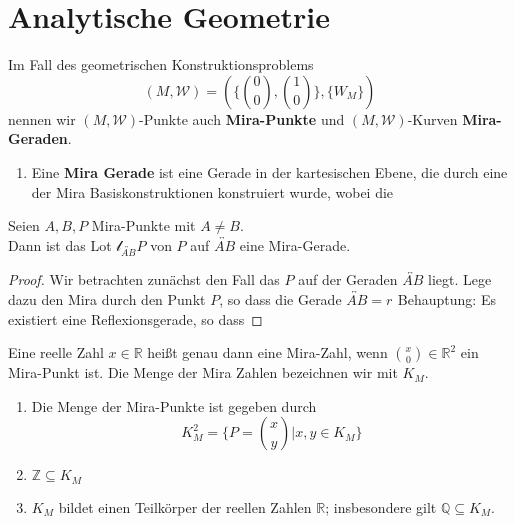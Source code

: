 \chapter{Analytische Geometrie}

\begin{definition}
    Im Fall des geometrischen Konstruktionsproblems
    \[ (M,\mathcal{W}) = (\{\binom{0}{0},\binom{1}{0} \}, \{ W_M\}) \]
    nennen wir $(M,\mathcal{W})$-Punkte auch \textbf{Mira-Punkte} und $(M,\mathcal{W})$-Kurven \textbf{Mira-Geraden}.
\end{definition}

\begin{definition}
    \begin{enumerate}
        \item Eine \textbf{Mira Gerade} ist eine Gerade in der kartesischen Ebene, die durch eine der Mira Basiskonstruktionen konstruiert wurde, wobei die 
    \end{enumerate}
\end{definition}

\begin{lemma}
    \label{Lot}
    Seien $A,B,P$ Mira-Punkte mit $A \neq B$. \\
    Dann ist das Lot $\mathcal{l}_{\overleftrightarrow{AB}}P$ von $P$ auf $\overleftrightarrow{AB}$ eine Mira-Gerade.
\end{lemma}

\begin{proof}
    Wir betrachten zunächst den Fall das $P$ auf der Geraden $\overleftrightarrow{AB}$ liegt.
    Lege dazu den Mira durch den Punkt $P$, so dass die Gerade $\overleftrightarrow{AB} = r_{}$
    Behauptung: Es existiert eine Reflexionsgerade, so dass 
\end{proof}

\begin{definition}
    Eine reelle Zahl $x \in \mathbb{R}$ heißt genau dann eine Mira-Zahl, wenn $\binom{x}{0} \in \mathbb{R}^2$ ein Mira-Punkt ist. 
    Die Menge der Mira Zahlen bezeichnen wir mit $K_M$.
\end{definition}

\begin{proposition}
    \begin{enumerate}[label=(\alph*)]
        \item Die Menge der Mira-Punkte ist gegeben durch
        $$K_M^2 = \{P=\binom{x}{y} \vert x,y \in K_M\}$$
        \item $\mathbb{Z} \subseteq K_M$
        \item $K_M$ bildet einen Teilkörper der reellen Zahlen $\mathbb{R}$; insbesondere gilt $\mathbb{Q} \subseteq K_M$.
    \end{enumerate}
\end{proposition}

